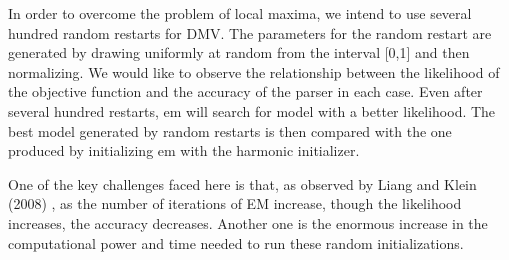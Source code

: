 \documentclass{article}
\begin{document}
 In order to overcome the problem of local maxima, we intend to use several hundred random restarts for DMV. The parameters for the random restart are generated by drawing uniformly at random from the interval [0,1] and then normalizing.  We would like to observe the relationship between the likelihood of the objective function and the accuracy of the parser in each case. Even after several hundred restarts, em will search for model with a better likelihood. The best model generated by random restarts is then compared with the one produced by initializing em with the harmonic initializer.

One of the key challenges faced here is that, as observed by Liang and Klein (2008) \cite{liang2008}, as the number of iterations of EM increase, though the likelihood increases, the accuracy decreases. Another one is the enormous increase in the computational power and time needed to run these random initializations.




\end{document}
